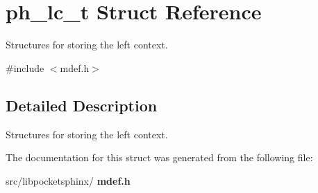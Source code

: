 \section{ph\+\_\+lc\+\_\+t Struct Reference}
\label{structph__lc__t}


Structures for storing the left context.  




{\ttfamily \#include $<$mdef.\+h$>$}



\subsection{Detailed Description}
Structures for storing the left context. 

The documentation for this struct was generated from the following file\+:\begin{DoxyCompactItemize}
\item 
src/libpocketsphinx/\textbf{ mdef.\+h}\end{DoxyCompactItemize}
